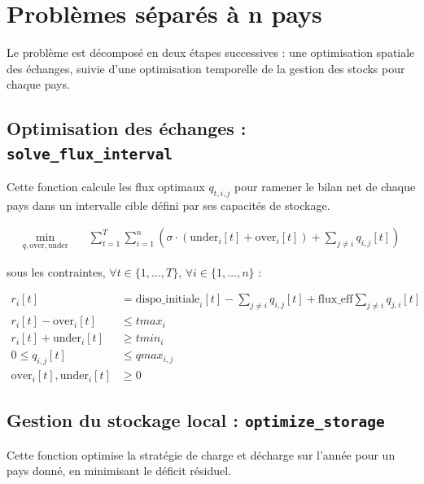 \documentclass[12pt,a4paper]{article}
\begin{document}
\newpage

\section{Problèmes séparés à n pays}
Le problème est décomposé en deux étapes successives : une optimisation spatiale des échanges, suivie d'une optimisation temporelle de la gestion des stocks pour chaque pays.

\subsection{Optimisation des échanges : \texttt{solve\_flux\_interval}}

Cette fonction calcule les flux optimaux $q_{t,i,j}$ pour ramener le bilan net de chaque pays dans un intervalle cible défini par ses capacités de stockage.

\begin{tcolorbox}[colback=violet!5!white, colframe=blue!75!black, breakable]
    \begin{align*}
        \min_{q, \text{over}, \text{under}} \quad & \sum_{t=1}^T \sum_{i=1}^n \left( \sigma \cdot (\text{under}_{i}[t] + \text{over}_{i}[t]) + \sum_{j\neq i} q_{i,j}[t] \right)
    \end{align*}
    
    sous les contraintes, $\forall t \in \{1,\dots,T\}$, $\forall i \in \{1,\dots,n\}$ :
    
    \begin{align}
        r_{i}[t] &= \text{dispo\_initiale}_{i}[t] - \sum_{j \neq i} q_{i,j}[t] + \text{flux\_eff} \sum_{j \neq i} q_{j,i}[t] \\
        r_{i}[t] - \text{over}_{i}[t] &\le tmax_i \\
        r_{i}[t] + \text{under}_{i}[t] &\ge tmin_i \\
        0 \le q_{i,j}[t] &\le qmax_{i,j} \\
        \text{over}_{i}[t], \text{under}_{i}[t] &\ge 0
    \end{align}
\end{tcolorbox}

\newpage

\subsection{Gestion du stockage local : \texttt{optimize\_storage}}
Cette fonction optimise la stratégie de charge et décharge sur l'année pour un pays donné, en minimisant le déficit résiduel.
\end{document}
